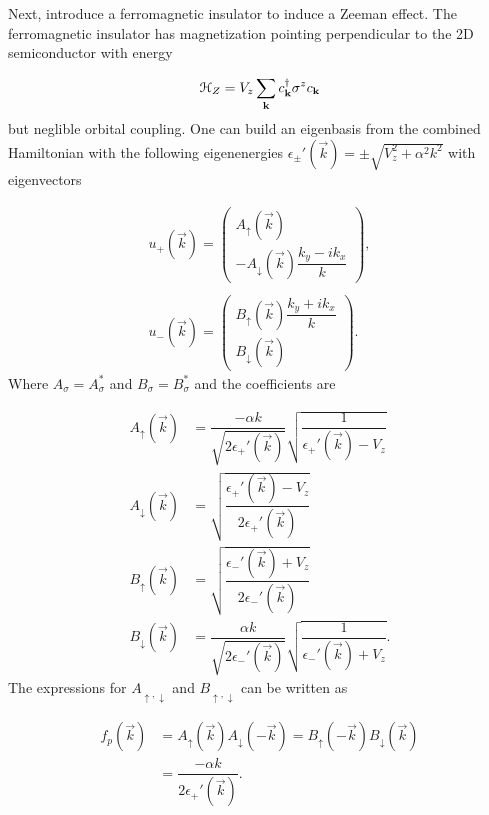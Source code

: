Next, introduce a ferromagnetic insulator to induce a Zeeman effect.
The ferromagnetic insulator has magnetization pointing perpendicular to the 2D semiconductor with energy

\begin{equation}
  \mathcal{H}_Z = V_z \sum_{\mathbf{k}} c^{\dagger}_{\mathbf{k}} \sigma^z c_{\mathbf{k}}
\end{equation}
but neglible orbital coupling.
One can build an eigenbasis from the combined Hamiltonian with the following eigenenergies $\epsilon_{\pm}'(\vec{k}) = \pm \sqrt{V_z^2+\alpha^2 k^2}$ with eigenvectors

\begin{align}
  u_+(\vec{k})  =
  \left( \begin{array}{l}
      A_\uparrow(\vec{k}) \\
      -A_\downarrow(\vec{k}) \dfrac{k_y - i k_x}{k}
  \end{array} \right),
  \\ \\
  u_-(\vec{k})  =
  \left( \begin{array}{l}
      B_\uparrow(\vec{k}) \dfrac{k_y + i k_x}{k}  \\
      B_\downarrow(\vec{k})
  \end{array} \right).
\end{align}
Where $A_{\sigma}=A_{\sigma}^*$ and $B_{\sigma}=B_{\sigma}^*$ and the coefficients are

\begin{align}
  A_{\uparrow}(\vec{k}) &= \dfrac{-\alpha k}{\sqrt{2\epsilon_+'(\vec{k})}} \sqrt{\dfrac{1}{\epsilon_+'(\vec{k})-V_z}} \\
A_{\downarrow}(\vec{k}) &= \sqrt{\dfrac{\epsilon_+'(\vec{k})-V_z}{2\epsilon_+'(\vec{k})}} \\
B_{\uparrow}(\vec{k}) &= \sqrt{\dfrac{\epsilon_-'(\vec{k})+V_z}{2\epsilon_-'(\vec{k})}} \\
B_{\downarrow}(\vec{k}) &= \dfrac{\alpha k}{\sqrt{2\epsilon_-'(\vec{k})}} \sqrt{\dfrac{1}{\epsilon_-'(\vec{k})+V_z}}.
\end{align}
The expressions for $A_{\uparrow,\downarrow}$ and $B_{\uparrow,\downarrow}$ can be written as

\begin{align}
  f_p(\vec{k}) &= A_{\uparrow}(\vec{k})A_{\downarrow}(-\vec{k}) = B_{\uparrow}(-\vec{k})B_{\downarrow}(\vec{k}) \\
  &= \dfrac{-\alpha k}{2\epsilon_+'(\vec{k})}.
\end{align}

